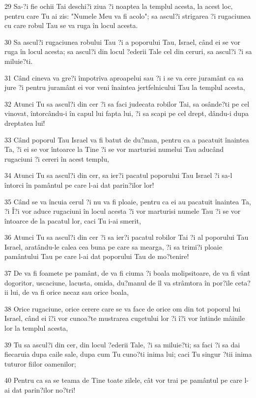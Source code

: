 \par 29 Sa-?i fie ochii Tai deschi?i ziua ?i noaptea la templul acesta, la acest loc, pentru care Tu ai zis: "Numele Meu va fi acolo"; sa ascul?i strigarea ?i rugaciunea cu care robul Tau se va ruga în locul acesta.
\par 30 Sa ascul?i rugaciunea robului Tau ?i a poporului Tau, Israel, când ei se vor ruga în locul acesta; sa ascul?i din locul ?ederii Tale cel din ceruri, sa ascul?i ?i sa miluie?ti.
\par 31 Când cineva va gre?i împotriva aproapelui sau ?i i se va cere juramânt ca sa jure ?i pentru juramânt ei vor veni înaintea jertfelnicului Tau la templul acesta,
\par 32 Atunci Tu sa ascul?i din cer ?i sa faci judecata robilor Tai, sa osânde?ti pe cel vinovat, întorcându-i în capul lui fapta lui, ?i sa scapi pe cel drept, dându-i dupa dreptatea lui!
\par 33 Când poporul Tau Israel va fi batut de du?man, pentru ca a pacatuit înaintea Ta, ?i ei se vor întoarce la Tine ?i se vor marturisi numelui Tau aducând rugaciuni ?i cereri în acest templu,
\par 34 Atunci Tu sa ascul?i din cer, sa ier?i pacatul poporului Tau Israel ?i sa-l întorci în pamântul pe care l-ai dat parin?ilor lor!
\par 35 Când se va încuia cerul ?i nu va fi ploaie, pentru ca ei au pacatuit înaintea Ta, ?i Î?i vor aduce rugaciuni în locul acesta ?i vor marturisi numele Tau ?i se vor întoarce de la pacatul lor, caci Tu i-ai smerit,
\par 36 Atunci Tu sa ascul?i din cer ?i sa ier?i pacatul robilor Tai ?i al poporului Tau Israel, aratându-le calea cea buna pe care sa mearga, ?i sa trimi?i ploaie pamântului Tau pe care l-ai dat poporului Tau de mo?tenire!
\par 37 De va fi foamete pe pamânt, de va fi ciuma ?i boala molipsitoare, de va fi vânt dogoritor, uscaciune, lacusta, omida, du?manul de îl va strâmtora în por?ile ceta?ii lui, de va fi orice necaz sau orice boala,
\par 38 Orice rugaciune, orice cerere care se va face de orice om din tot poporul lui Israel, când ei î?i vor cunoa?te mustrarea cugetului lor ?i î?i vor întinde mâinile lor la templul acesta,
\par 39 Tu sa ascul?i din cer, din locul ?ederii Tale, ?i sa miluie?ti; sa faci ?i sa dai fiecaruia dupa caile sale, dupa cum Tu cuno?ti inima lui; caci Tu singur ?tii inima tuturor fiilor oamenilor;
\par 40 Pentru ca sa se teama de Tine toate zilele, cât vor trai pe pamântul pe care l-ai dat parin?ilor no?tri!

